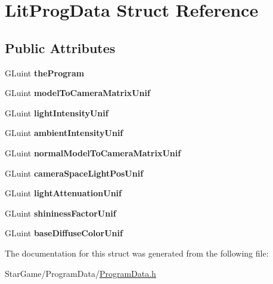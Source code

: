\hypertarget{struct_lit_prog_data}{\section{Lit\-Prog\-Data Struct Reference}
\label{struct_lit_prog_data}
}
\subsection*{Public Attributes}
\begin{DoxyCompactItemize}
\item 
\hypertarget{struct_lit_prog_data_a50e45901aa3f961436f12c02ae80709c}{G\-Luint {\bfseries the\-Program}}\label{struct_lit_prog_data_a50e45901aa3f961436f12c02ae80709c}

\item 
\hypertarget{struct_lit_prog_data_a9773d4682a57ff484b7642d78437b537}{G\-Luint {\bfseries model\-To\-Camera\-Matrix\-Unif}}\label{struct_lit_prog_data_a9773d4682a57ff484b7642d78437b537}

\item 
\hypertarget{struct_lit_prog_data_a2238f8cc39c5e8f0810241f2b4db7117}{G\-Luint {\bfseries light\-Intensity\-Unif}}\label{struct_lit_prog_data_a2238f8cc39c5e8f0810241f2b4db7117}

\item 
\hypertarget{struct_lit_prog_data_a07fcff4c9e7393f39eb553c21b82ffa1}{G\-Luint {\bfseries ambient\-Intensity\-Unif}}\label{struct_lit_prog_data_a07fcff4c9e7393f39eb553c21b82ffa1}

\item 
\hypertarget{struct_lit_prog_data_a4c28703d5d72139c3d9f69a9d3b46b47}{G\-Luint {\bfseries normal\-Model\-To\-Camera\-Matrix\-Unif}}\label{struct_lit_prog_data_a4c28703d5d72139c3d9f69a9d3b46b47}

\item 
\hypertarget{struct_lit_prog_data_ab7c502fcd0068b43e51b9d1f14192c74}{G\-Luint {\bfseries camera\-Space\-Light\-Pos\-Unif}}\label{struct_lit_prog_data_ab7c502fcd0068b43e51b9d1f14192c74}

\item 
\hypertarget{struct_lit_prog_data_a53d989d50b048185e28cc0633459f591}{G\-Luint {\bfseries light\-Attenuation\-Unif}}\label{struct_lit_prog_data_a53d989d50b048185e28cc0633459f591}

\item 
\hypertarget{struct_lit_prog_data_aa7d8b53bc0c043f2d7d096f5c3f88a9e}{G\-Luint {\bfseries shininess\-Factor\-Unif}}\label{struct_lit_prog_data_aa7d8b53bc0c043f2d7d096f5c3f88a9e}

\item 
\hypertarget{struct_lit_prog_data_a9a6394527b4dfb605ca37ecc250a571b}{G\-Luint {\bfseries base\-Diffuse\-Color\-Unif}}\label{struct_lit_prog_data_a9a6394527b4dfb605ca37ecc250a571b}

\end{DoxyCompactItemize}


The documentation for this struct was generated from the following file\-:\begin{DoxyCompactItemize}
\item 
Star\-Game/\-Program\-Data/\hyperlink{_program_data_8h}{Program\-Data.\-h}\end{DoxyCompactItemize}
